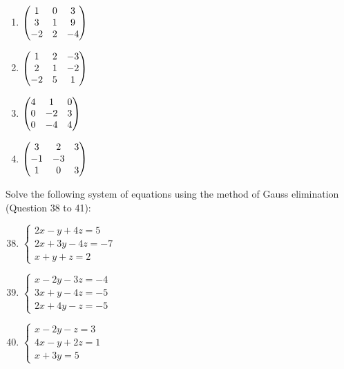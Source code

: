 \documentclass{report}
\begin{document}
\begin{multicols}{2}
\begin{enumerate}[wide, labelwidth=!, labelindent=0pt]
        \item $\begin{pmatrix}
                      1 & 0 & 3\\
                      3 & 1 & 9\\
                      -2 & 2 & -4
                  \end{pmatrix}$

        \item $\begin{pmatrix}
                      1 & 2 & -3\\
                      2 & 1 & -2\\
                      -2 & 5 & 1
                  \end{pmatrix}$

        \item $\begin{pmatrix}
                      4 & 1 & 0\\
                      0 & -2 & 3\\
                      0 & -4 & 4
                  \end{pmatrix}$

        \item $\begin{pmatrix}
                      3 & 2 & 3\\
                      -1 & -3 & \\
                      1 & 0 & 3
                  \end{pmatrix}$

    \end{enumerate}

    \noindent Solve the following system of equations using the method of Gauss elimination (Question 38 to 41):

    \begin{enumerate}[wide, labelwidth=!, labelindent=0pt]
        \setcounter{enumi}{37}

        \item $\begin{cases}
                      2x - y + 4z = 5   \\
                      2x + 3y - 4z = -7 \\
                      x + y + z = 2
                  \end{cases}$

        \item $\begin{cases}
                      x - 2y - 3z = -4 \\
                      3x + y - 4z = -5 \\
                      2x + 4y - z = -5
                  \end{cases}$

        \item $\begin{cases}
                      x - 2y - z = 3  \\
                      4x - y + 2z = 1 \\
                      x + 3y = 5
                  \end{cases}$


\end{enumerate}
\end{multicols}
\end{document}
